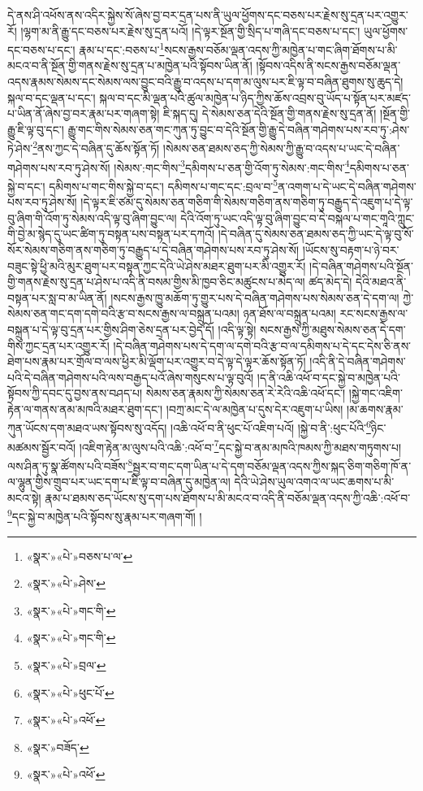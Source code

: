 དེ་ནས་ཤི་འཕོས་ནས་འདིར་སྐྱེས་སོ་ཞེས་བྱ་བར་དྲན་པས་ནི་ཡུལ་ཕྱོགས་དང་བཅས་པར་རྗེས་སུ་དྲན་པར་འགྱུར་རོ། །ལྷག་མ་ནི་རྒྱུ་དང་བཅས་པར་རྗེས་སུ་དྲན་པའོ། །དེ་ལྟར་སྔོན་གྱི་སྲིད་པ་གཞི་དང་བཅས་པ་དང་། ཡུལ་ཕྱོགས་དང་བཅས་པ་དང་། རྣམ་པ་དང་:བཅས་པ་\footnote{«སྣར་»«པེ་»བཅས་པ་ལ་}སངས་རྒྱས་བཅོམ་ལྡན་འདས་ཀྱི་མཁྱེན་པ་གང་ཞིག་ཐོགས་པ་མི་མངའ་བ་ནི་སྔོན་གྱི་གནས་རྗེས་སུ་དྲན་པ་མཁྱེན་པའི་སྟོབས་ཡིན་ནོ། །སྟོབས་འདིས་ནི་སངས་རྒྱས་བཅོམ་ལྡན་འདས་རྣམས་སེམས་དང་སེམས་ལས་བྱུང་བའི་རྒྱུ་བ་འདས་པ་དག་མ་ལུས་པར་ཇི་ལྟ་བ་བཞིན་ཐུགས་སུ་ཆུད་དེ། སྐལ་བ་དང་ལྡན་པ་དང་། སྐལ་བ་དང་མི་ལྡན་པའི་ཚུལ་མཁྱེན་པ་ཉིད་ཀྱིས་ཆོས་འབྲས་བུ་ཡོད་པ་སྟོན་པར་མཛད་པ་ཡིན་ནོ་ཞེས་བྱ་བར་རྣམ་པར་གཞག་སྟེ། ཇི་སྐད་དུ། དེ་སེམས་ཅན་དེའི་སྔོན་གྱི་གནས་རྗེས་སུ་དྲན་ནོ། །སྔོན་གྱི་རྒྱུ་ཇི་ལྟ་བུ་དང་། རྒྱུ་གང་གིས་སེམས་ཅན་གང་ཀུན་ཏུ་བྱུང་བ་དེའི་སྔོན་གྱི་རྒྱུ་དེ་བཞིན་གཤེགས་པས་རབ་ཏུ་:ཤེས་ཏེ་ཤེས་\footnote{«སྣར་»«པེ་»ཤེས་}ནས་ཀྱང་དེ་བཞིན་དུ་ཆོས་སྟོན་ཏོ། །སེམས་ཅན་ཐམས་ཅད་ཀྱི་སེམས་ཀྱི་རྒྱུ་བ་འདས་པ་ཡང་དེ་བཞིན་གཤེགས་པས་རབ་ཏུ་ཤེས་སོ། །སེམས་:གང་གིས་\footnote{«སྣར་»«པེ་»གང་གི་}དམིགས་པ་ཅན་གྱི་འོག་ཏུ་སེམས་:གང་གིས་\footnote{«སྣར་»«པེ་»གང་གི་}དམིགས་པ་ཅན་སྐྱེ་བ་དང་། དམིགས་པ་གང་གིས་སྐྱེ་བ་དང་། དམིགས་པ་གང་དང་:བྲལ་བ་\footnote{«སྣར་»«པེ་»བྲལ་}ན་འགག་པ་དེ་ཡང་དེ་བཞིན་གཤེགས་པས་རབ་ཏུ་ཤེས་སོ། །དེ་ལྟར་ཇི་ཙམ་དུ་སེམས་ཅན་གཅིག་གི་སེམས་གཅིག་ནས་གཅིག་ཏུ་བརྒྱུད་དེ་འཇུག་པ་དེ་ལྟ་བུ་ཞིག་གི་འོག་ཏུ་སེམས་འདི་ལྟ་བུ་ཞིག་བྱུང་ལ། དེའི་འོག་ཏུ་ཡང་འདི་ལྟ་བུ་ཞིག་བྱུང་བ་དེ་བསྐལ་པ་གང་གཱའི་ཀླུང་གི་བྱེ་མ་སྙེད་དུ་ཡང་ཚིག་ཏུ་བསྟན་པས་བསྟན་པར་དཀའོ། །དེ་བཞིན་དུ་སེམས་ཅན་ཐམས་ཅད་ཀྱི་ཡང་དེ་ལྟ་བུ་སོ་སོར་སེམས་གཅིག་ནས་གཅིག་ཏུ་བརྒྱུད་པ་དེ་བཞིན་གཤེགས་པས་རབ་ཏུ་ཤེས་སོ། །ཡོངས་སུ་བརྟག་པ་ཉེ་བར་བཟུང་སྟེ་ཕྱི་མའི་མུར་ཐུག་པར་བསྟན་ཀྱང་དེའི་ཡེ་ཤེས་མཐར་ཐུག་པར་མི་འགྱུར་རོ། །དེ་བཞིན་གཤེགས་པའི་སྔོན་གྱི་གནས་རྗེས་སུ་དྲན་པ་ཤེས་པ་འདི་ནི་བསམ་གྱིས་མི་ཁྱབ་ཅིང་མཚུངས་པ་མེད་ལ། ཚད་མེད་དེ། དེའི་མཐའ་ནི་བསྟན་པར་སླ་བ་མ་ཡིན་ནོ། །སངས་རྒྱས་ཁྱུ་མཆོག་ཏུ་གྱུར་པས་དེ་བཞིན་གཤེགས་པས་སེམས་ཅན་དེ་དག་ལ། ཀྱེ་སེམས་ཅན་གང་དག་དགེ་བའི་རྩ་བ་སངས་རྒྱས་ལ་བསྐྲུན་པའམ། ཉན་ཐོས་ལ་བསྐྲུན་པའམ། རང་སངས་རྒྱས་ལ་བསྐྲུན་པ་དེ་ལྟ་བུ་དྲན་པར་གྱིས་ཤིག་ཅེས་དྲན་པར་བྱེད་དོ། །འདི་ལྟ་སྟེ། སངས་རྒྱས་ཀྱི་མཐུས་སེམས་ཅན་དེ་དག་གིས་ཀྱང་དྲན་པར་འགྱུར་རོ། །དེ་བཞིན་གཤེགས་པས་དེ་དག་ལ་དགེ་བའི་རྩ་བ་ལ་དམིགས་པ་དེ་དང་དེས་ཅི་ནས་ཐེག་པས་རྣམ་པར་གྲོལ་བ་ལས་ཕྱིར་མི་ལྡོག་པར་འགྱུར་བ་དེ་ལྟ་དེ་ལྟར་ཆོས་སྟོན་ཏོ། །འདི་ནི་དེ་བཞིན་གཤེགས་པའི་དེ་བཞིན་གཤེགས་པའི་ལས་བརྒྱད་པའོ་ཞེས་གསུངས་པ་ལྟ་བུའོ། །ད་ནི་འཆི་འཕོ་བ་དང་སྐྱེ་བ་མཁྱེན་པའི་སྟོབས་ཀྱི་དབང་དུ་བྱས་ནས་བཤད་པ། སེམས་ཅན་རྣམས་ཀྱི་སེམས་ཅན་རེ་རེའི་འཆི་འཕོ་དང་། །སྐྱེ་གང་འཇིག་རྟེན་ལ་གནས་ནམ་མཁའི་མཐར་ཐུག་དང་། །བཀྲ་མང་དེ་ལ་མཁྱེན་པ་དུས་དེར་འཇུག་པ་ཡིས། །མ་ཆགས་རྣམ་ཀུན་ཡོངས་དག་མཐའ་ཡས་སྟོབས་སུ་འདོད། །འཆི་འཕོ་བ་ནི་ཕུང་པོ་འཇིག་པའོ། །སྐྱེ་བ་ནི་:ཕུང་པོའི་\footnote{«སྣར་»«པེ་»ཕུང་པོ་}ཉིང་མཚམས་སྦྱོར་བའོ། །འཇིག་རྟེན་མ་ལུས་པའི་འཆི་:འཕོ་བ་\footnote{«སྣར་»«པེ་»འཕོ་}དང་སྐྱེ་བ་ནམ་མཁའི་ཁམས་ཀྱི་མཐས་གཏུགས་པ། ལས་ཤིན་ཏུ་སྣ་ཚོགས་པའི་བཟོས་\footnote{«སྣར་»བཟོད་}སྦྱར་བ་གང་དག་ཡིན་པ་དེ་དག་བཅོམ་ལྡན་འདས་ཀྱིས་སྐད་ཅིག་གཅིག་ཁོ་ན་ལ་ལྷུན་གྱིས་གྲུབ་པར་ཡང་དག་པ་ཇི་ལྟ་བ་བཞིན་དུ་མཁྱེན་ལ། དེའི་ཡེ་ཤེས་ཡུལ་འགའ་ལ་ཡང་ཆགས་པ་མི་མངའ་སྟེ། རྣམ་པ་ཐམས་ཅད་ཡོངས་སུ་དག་པས་ཐོགས་པ་མི་མངའ་བ་འདི་ནི་བཅོམ་ལྡན་འདས་ཀྱི་འཆི་:འཕོ་བ་\footnote{«སྣར་»«པེ་»འཕོ་}དང་སྐྱེ་བ་མཁྱེན་པའི་སྟོབས་སུ་རྣམ་པར་གཞག་གོ། །
